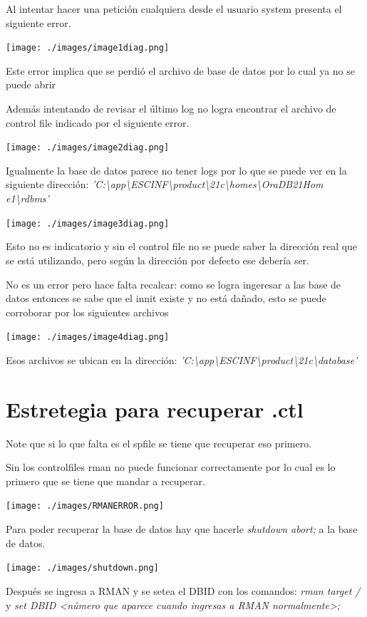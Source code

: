 \documentclass[11pt, article, natbib]{IEEEtran}
\begin{document}
Al intentar hacer una petición cualquiera desde el usuario system presenta el siguiente error.

\texttt{[image: ./images/image1diag.png]}

Este error implica que se perdió el archivo de base de datos por lo cual ya no se puede abrir

Además intentando de revisar el último log no logra encontrar el archivo de control file indicado por el siguiente error.

\texttt{[image: ./images/image2diag.png]}

Igualmente la base de datos parece no tener logs por lo que se puede ver en la siguiente dirección: \textit{'C:\textbackslash app\textbackslash ESCINF\textbackslash product\textbackslash 21c\textbackslash homes\textbackslash OraDB21Hom\\e1\textbackslash rdbms'}

\texttt{[image: ./images/image3diag.png]}

Esto no es indicatorio y sin el control file no se puede saber la dirección real que se está utilizando, pero según la dirección por defecto ese debería ser.

No es un error pero hace falta recalcar: como se logra ingeresar a las base de datos entonces se sabe que el innit existe y no está dañado, esto se puede corroborar por los siguientes archivos

\texttt{[image: ./images/image4diag.png]}

Esos archivos se ubican en la dirección: \textit{'C:\textbackslash app\textbackslash ESCINF\textbackslash product\textbackslash 21c\textbackslash database'}
\section{Estretegia para recuperar .ctl}
Note que si lo que falta es el spfile se tiene que recuperar eso primero.

Sin los controlfiles rman no puede funcionar correctamente por lo cual es lo primero que se tiene que mandar a recuperar.

\texttt{[image: ./images/RMANERROR.png]}

Para poder recuperar la base de datos hay que hacerle \textit{shutdown abort;} a la base de datos.

\texttt{[image: ./images/shutdown.png]}

Después se ingresa a RMAN y se setea el DBID con los comandos:
\textit{rman target /} y \textit{set DBID <número que aparece cuando ingresas a RMAN normalmente>;}
\end{document}
